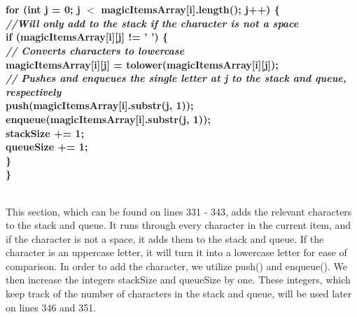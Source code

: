 \documentclass{article}
\begin{document}
\textbf{
\\~\\
        \indent \indent for (int j = 0; j $<$ magicItemsArray[i].length(); j++) \{\\
            \textit{ \indent \indent \indent //Will only add to the stack if the character is not a space\\ }
            \indent \indent \indent if (magicItemsArray[i][j] != ' ') \{\\
                \textit{ \indent \indent \indent \indent // Converts characters to lowercase\\ }
                \indent \indent \indent \indent magicItemsArray[i][j] = tolower(magicItemsArray[i][j]);\\
                \textit{ \indent \indent \indent \indent // Pushes and enqueues the single letter at j to the stack and queue, respectively\\ }
                \indent \indent \indent \indent push(magicItemsArray[i].substr(j, 1));\\
                \indent \indent \indent \indent enqueue(magicItemsArray[i].substr(j, 1));\\
                \indent \indent \indent \indent stackSize += 1;\\
                \indent \indent \indent \indent queueSize += 1;\\
            \indent \indent \indent \}\\
        \indent \indent \}\\~\\ }

This section, which can be found on lines 331 - 343, adds the relevant characters to the stack and queue. It runs through every character in the current item, and if the character is not a space, it adds them to the stack and queue. If the character is an uppercase letter, it will turn it into a lowercase letter for ease of comparison. In order to add the character, we utilize push() and enqueue(). We then increase the integers stackSize and queueSize by one. These integers, which keep track of the number of characters in the stack and queue, will be used later on lines 346 and 351. 
\end{document}
